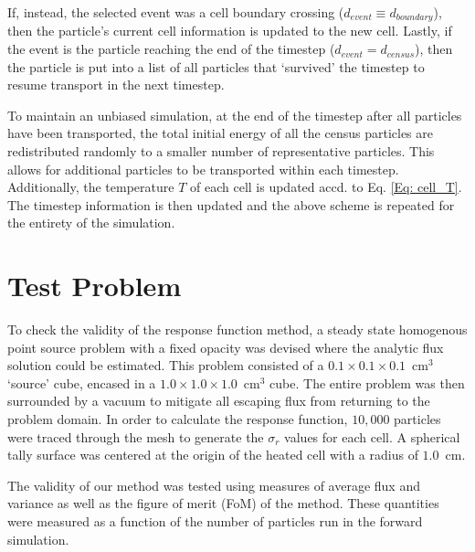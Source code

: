 If, instead, the selected event was a cell boundary crossing ($d_{event} \equiv d_{boundary}$), then the particle's current cell information is updated to the new cell. Lastly, if the event is the particle reaching the end of the timestep ($d_{event} = d_{census}$), then the particle is put into a list of all particles that `survived' the timestep to resume transport in the next timestep. 

To maintain an unbiased simulation, at the end of the timestep after all particles have been transported, the total initial energy of all the census particles are redistributed randomly to a smaller number of representative particles. This allows for additional particles to be transported within each timestep. Additionally, the temperature $T$ of each cell is updated accd. to Eq. \ref{Eq: cell_T}. The timestep information is then updated and the above scheme is repeated for the entirety of the simulation. 

\section{Test Problem}
To check the validity of the response function method, a steady state homogenous point source problem with a fixed opacity was devised where the analytic flux solution could be estimated. This problem consisted of a $0.1 \times 0.1 \times 0.1$~cm$^3$ `source' cube, encased in a $1.0 \times 1.0 \times 1.0$~cm$^3$ cube. The entire problem was then surrounded by a vacuum to mitigate all escaping flux from returning to the problem domain. In order to calculate the response function, $10,000$ particles were traced through the mesh to generate the $\sigma_{r}$ values for each cell. A spherical tally surface was centered at the origin of the heated cell with a radius of $1.0$~cm. 

The validity of our method was tested using measures of average flux and variance as well as the figure of merit (FoM) of the method. These quantities were measured as a function of the number of particles run in the forward simulation. 

